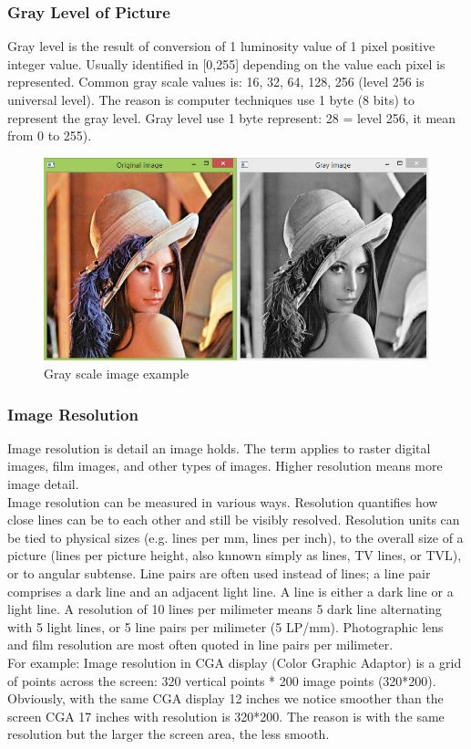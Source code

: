         \subsubsection{Gray Level of Picture}
            Gray level is the result of conversion of 1 luminosity value of 1 pixel positive integer value. Usually identified in [0,255] depending on the value each pixel is 
            represented. Common gray scale values is: 16, 32, 64, 128, 256 (level 256 is universal level). The reason is computer techniques use 1 byte (8 bits) to represent 
            the gray level. Gray level use 1 byte represent: 28 = level 256, it mean from 0 to 255).
            \begin{figure}[H]
                \centering
                \includegraphics[width=0.6\linewidth]{img/gray-scale.png}
                \caption{Gray scale image example}
            \end{figure}
        \subsubsection{Image Resolution}
            Image resolution is detail an image holds. The term applies to raster digital images, film images, and other types of images. Higher resolution means more image detail. \\ 
            \vspace{3mm}
            Image resolution can be measured in various ways. Resolution quantifies how close lines can be to each other and still be visibly resolved. Resolution units can be tied 
            to physical sizes (e.g. lines per mm, lines per inch), to the overall size of a picture (lines per picture height, also knnown simply as lines, TV lines, or TVL), 
            or to angular subtense. Line pairs are often used instead of lines; a line pair comprises a dark line and an adjacent light line. A line is either a dark line or 
            a light line. A resolution of 10 lines per milimeter means 5 dark line alternating with 5 light lines, or 5 line pairs per milimeter (5 LP/mm). Photographic lens and film 
            resolution are most often quoted in line pairs per milimeter. \\ 
            \vspace{3mm}
            For example: Image resolution in CGA display (Color Graphic Adaptor) is a grid of points across the screen: 320 vertical points * 200 image points (320*200).
            Obviously, with the same CGA display 12 inches we notice smoother than the screen CGA 17 inches with resolution is 320*200. The reason is with the same resolution but 
            the larger the screen area, the less smooth.
